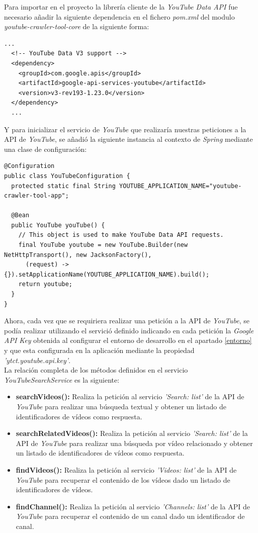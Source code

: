 \documentclass[11pt,a4paper]{article}
\begin{document}
Para importar en el proyecto la librería cliente de la \textit{YouTube Data API} fue necesario añadir la siguiente dependencia en el fichero \textit{pom.xml} del modulo \textit{youtube-crawler-tool-core} de la siguiente forma:
\begin{lstlisting}[style=C]
  ...
  <!-- YouTube Data V3 support -->
  <dependency>
    <groupId>com.google.apis</groupId>
    <artifactId>google-api-services-youtube</artifactId>
    <version>v3-rev193-1.23.0</version>
  </dependency>
  ...
\end{lstlisting}	

Y para inicializar el servicio de \textit{YouTube} que realizaría nuestras peticiones a la API de \textit{YouTube}, se añadió la siguiente instancia al contexto de \textit{Spring} mediante una clase de configuración:
\begin{lstlisting}[style=C]
@Configuration
public class YouTubeConfiguration {
  protected static final String YOUTUBE_APPLICATION_NAME="youtube-crawler-tool-app";
  
  @Bean
  public YouTube youTube() {
    // This object is used to make YouTube Data API requests.
    final YouTube youtube = new YouTube.Builder(new NetHttpTransport(), new JacksonFactory(),
      (request) -> {}).setApplicationName(YOUTUBE_APPLICATION_NAME).build();
    return youtube;
  }
}
\end{lstlisting}	
\pagebreak 

Ahora, cada vez que se requiriera realizar una petición a la API de \textit{YouTube}, se podía realizar utilizando el servició definido indicando en cada petición la \textit{Google API Key} obtenida al configurar el entorno de desarrollo en el apartado \ref{entorno} y que esta configurada en la aplicación mediante la propiedad \textit{'ytct.youtube.api.key'}. 
\\

La relación completa de los métodos definidos en el servicio \textit{YouTubeSearchService} es la siguiente:
\begin{itemize}
\item \textbf{searchVideos():} Realiza la petición al servicio \textit{'Search: list'} de la API de \textit{YouTube} para realizar una búsqueda textual y obtener un listado de identificadores de vídeos como respuesta.
\item \textbf{searchRelatedVideos():} Realiza la petición al servicio \textit{'Search: list'} de la API de \textit{YouTube} para realizar una búsqueda por vídeo relacionado y obtener un listado de identificadores de vídeos como respuesta.
\item \textbf{findVideos():} Realiza la petición al servicio \textit{'Videos: list'} de la API de \textit{YouTube} para recuperar el contenido de los vídeos dado un listado de identificadores de vídeos.
\item \textbf{findChannel():} Realiza la petición al servicio \textit{'Channels: list'} de la API de \textit{YouTube} para recuperar el contenido de un canal dado un identificador de canal.
\end{itemize}
\end{document}
